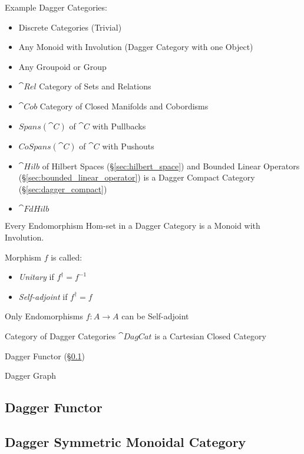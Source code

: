 Example Dagger Categories:
\begin{itemize}
  \item Discrete Categories (Trivial)
  \item Any Monoid with Involution (Dagger Category with one Object)
  \item Any Groupoid or Group
  \item $\cat{Rel}$ Category of Sets and Relations
  \item $\cat{Cob}$ Category of Closed Manifolds and Cobordisms
  \item $Spans(\cat{C})$ of $\cat{C}$ with Pullbacks
  \item $CoSpans(\cat{C})$ of $\cat{C}$ with Pushouts
  \item $\cat{Hilb}$ of Hilbert Spaces (\S\ref{sec:hilbert_space}) and
    Bounded Linear Operators (\S\ref{sec:bounded_linear_operator}) is
    a Dagger Compact Category (\S\ref{sec:dagger_compact})
  \item $\cat{FdHilb}$
\end{itemize}

Every Endomorphism Hom-set in a Dagger Category is a Monoid with
Involution.

Morphism $f$ is called:
\begin{itemize}
  \item \emph{Unitary} if $f^\dag = f^{-1}$
  \item \emph{Self-adjoint} if $f^\dag = f$
\end{itemize}

Only Endomorphisms $f : A \rightarrow A$ can be Self-adjoint

Category of Dagger Categories $\cat{DagCat}$ is a Cartesian Closed
Category

Dagger Functor (\S\ref{sec:dagger_functor})

Dagger Graph %



\subsection{Dagger Functor}\label{sec:dagger_functor}

\subsection{Dagger Symmetric Monoidal Category}
\label{sec:dagger_symmetric_monoidal}


